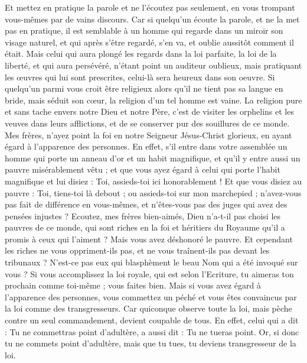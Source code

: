 \begin{multicols}{2}
Et mettez en pratique la parole et ne l'écoutez pas seulement, en vous trompant vous-mêmes par de vains discours.
Car si quelqu'un écoute la parole, et ne la met pas en pratique, il est semblable à un homme qui regarde dans un miroir son visage naturel,
et qui après s'être regardé, s'en va, et oublie aussitôt comment il était.
Mais celui qui aura plongé les regards dans la loi parfaite, la loi de la liberté, et qui aura persévéré, n'étant point un auditeur oublieux, mais pratiquant les œuvres qui lui sont prescrites, celui-là sera heureux dans son oeuvre.
Si quelqu'un parmi vous croit être religieux alors qu'il ne tient pas sa langue en bride, mais séduit son cœur, la religion d'un tel homme est vaine.
La religion pure et sans tache envers notre Dieu et notre Père, c'est de visiter les orphelins et les veuves dans leurs afflictions, et de se conserver pur des souillures de ce monde.
\VerseOne{}Mes frères, n'ayez point la foi en notre Seigneur Jésus-Christ glorieux, en ayant égard à l'apparence des personnes.
En effet, s'il entre dans votre assemblée un homme qui porte un anneau d'or et un habit magnifique, et qu'il y entre aussi un pauvre misérablement vêtu ;
et que vous ayez égard à celui qui porte l'habit magnifique et lui disiez : Toi, assieds-toi ici honorablement ! Et que vous disiez au pauvre : Toi, tiens-toi là debout ; ou assieds-toi sur mon marchepied ;
n'avez-vous pas fait de différence en vous-mêmes, et n'êtes-vous pas des juges qui avez des pensées injustes ?
Ecoutez, mes frères bien-aimés, Dieu n'a-t-il pas choisi les pauvres de ce monde, qui sont riches en la foi et héritiers du Royaume qu'il a promis à ceux qui l'aiment ?
Mais vous avez déshonoré le pauvre. Et cependant les riches ne vous oppriment-ils pas, et ne vous traînent-ils pas devant les tribunaux ?
N'est-ce pas eux qui blasphèment le beau Nom qui a été invoqué sur vous ?
Si vous accomplissez la loi royale, qui est selon l'Ecriture, tu aimeras ton prochain comme toi-même ; vous faites bien.
Mais si vous avez égard à l'apparence des personnes, vous commettez un péché et vous êtes convaincus par la loi comme des transgresseurs.
Car quiconque observe toute la loi, mais pèche contre un seul commandement, devient coupable de tous.
En effet, celui qui a dit : Tu ne commettras point d'adultère, a aussi dit : Tu ne tueras point. Or, si donc tu ne commets point d'adultère, mais que tu tues, tu deviens transgresseur de la loi.

\end{multicols}
